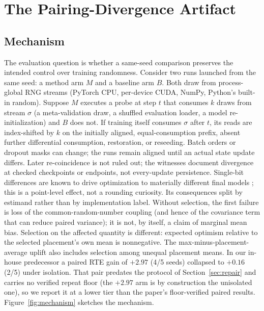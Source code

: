 \section{The Pairing-Divergence Artifact}
\label{sec:f2}

\subsection{Mechanism}

The evaluation question is whether a same-seed comparison preserves the
intended control over training randomness.
Consider two runs launched from the same seed: a method arm $M$ and a
baseline arm $B$. Both draw from process-global RNG streams (PyTorch CPU,
per-device CUDA, NumPy, Python's built-in random). Suppose $M$ executes a probe
at step $t$ that consumes $k$ draws from stream $\sigma$ (a meta-validation
draw, a shuffled evaluation loader, a model re-initialization) and $B$ does
not. If training itself consumes $\sigma$
after $t$, its reads are index-shifted by $k$ on the initially aligned,
equal-consumption prefix, absent further differential consumption, restoration,
or reseeding.
Batch orders or dropout masks can change; the runs remain aligned until an
actual state update differs. Later re-coincidence is not ruled out;
the witnesses document divergence at checked checkpoints or endpoints, not every-update persistence. Single-bit differences are known to drive optimization to
materially different final models \citep{summers2021nondeterminism}; this is a
point-level effect, not a rounding curiosity. Its consequences split by estimand rather than by implementation label.
Without selection, the first failure is loss of the common-random-number
coupling (and hence of the covariance term that can reduce paired variance);
it is not, by itself, a claim of marginal mean bias. Selection on the affected
quantity is different: expected optimism relative to the selected placement's
own mean is nonnegative. The max-minus-placement-average uplift also includes
selection among unequal placement means. In our in-house predecessor a paired RTE
gain of $+2.97$ (4/5 seeds) collapsed to $+0.16$ (2/5) under isolation. That
pair predates the protocol of Section~\ref{sec:repair} and carries no verified
repeat floor (the $+2.97$ arm is by construction the unisolated one), so we
report it at a lower tier than the paper's floor-verified paired results.
Figure~\ref{fig:mechanism} sketches the mechanism.

